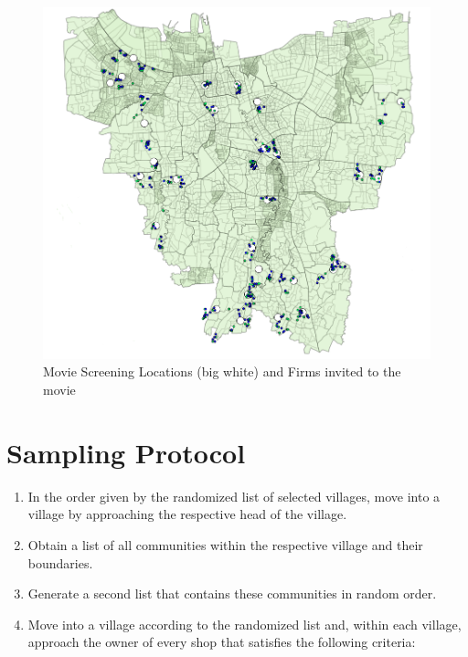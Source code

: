 \documentclass[11.5pt]{article}
\begin{document}
\begin{appendices}
\begin{landscape}
\pagebreak

\begin{figure}[h!]
    \centering
    \caption{Movie Screening Locations (big white) and Firms invited to the movie}
   	\includegraphics[width=120mm]{FigmapMovie.png}
\end{figure}

\end{landscape}
\pagebreak


\section{Sampling Protocol} \label{sec:appendixd}
\begin{enumerate}

	\item In the order given by the randomized list of selected villages, move 					into a village by approaching the respective head of the village.

	\item Obtain a list of all communities within the respective village and their 				boundaries.
	
	\item Generate a second list that contains these communities in random order.

	\item Move into a village according to the randomized list and, within each 				village, approach the owner of every shop that satisfies the following 				criteria:

	\begin{enumerate}
	

\end{enumerate}
\end{enumerate}
\end{appendices}
\end{document}
